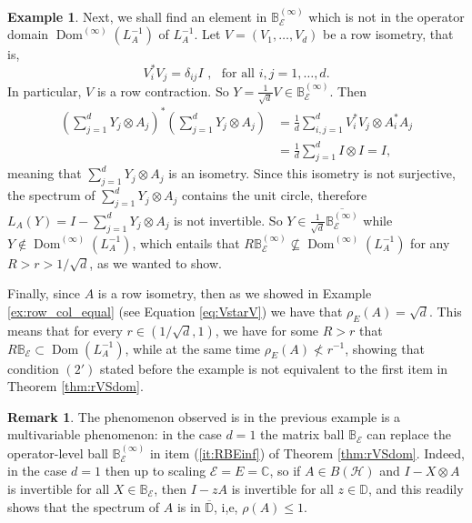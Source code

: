 \documentclass[12pt]{amsart}
\numberwithin{equation}{section}
\theoremstyle{definition}
\newtheorem{example}[theorem]{Example}
\newtheorem{remark}[theorem]{Remark}
\newcommand{\cE}{\mathcal{E}}
\newcommand{\cH}{\mathcal{H}}
\newcommand{\bB}{\mathbb{B}}
\newcommand{\bC}{\mathbb{C}}
\newcommand{\bD}{\mathbb{D}}
\newcommand{\ol}{\overline}
\newcommand{\dom}{\operatorname{Dom}}
\begin{document}
\begin{example}
    Next, we shall find an element in $\bB_\cE^{(\infty)}$ which is not in the operator domain $\dom^{(\infty)}(L_A^{-1})$ of $L_A^{-1}$. 
    Let $V = (V_1, \ldots, V_d)$ be a row isometry, that is, 
    \[
    V_i^* V_j = \delta_{ij}I \,\, , \,\, \textrm{ for all } i,j=1, \ldots, d. 
    \]
    In particular, $V$ is a row contraction. So $Y = \frac{1}{\sqrt{d}} V \in \bB_\cE^{(\infty)}$. 
    Then 
    \begin{align*}
    \left(\sum_{j=1}^d Y_j \otimes A_j\right)^* \left(\sum_{j=1}^d Y_j \otimes A_j\right) 
    &= \frac{1}{d}\sum_{i,j=1}^d V_i^* V_j \otimes A_i^* A_j \\
    &=\frac{1}{d} \sum_{j=1}^d I \otimes I = I, 
    \end{align*}
    meaning that $\sum_{j=1}^d Y_j \otimes A_j$ is an isometry. 
    Since this isometry is not surjective, the spectrum of $\sum_{j=1}^d Y_j \otimes A_j$ contains the unit circle, therefore $L_A(Y) = I - \sum_{j=1}^d Y_j \otimes A_j$ is not invertible. 
    So $Y \in \frac{1}{\sqrt{d}}\ol{\bB^{(\infty)}_\cE}$ while $Y \notin \dom^{(\infty)}(L_A^{-1})$, which entails that $R \bB^{(\infty)}_\cE \nsubseteq \dom^{(\infty)}(L_A^{-1})$ for any $R > r > 1/\sqrt{d}$, as we wanted to show. 

    Finally, since $A$ is a row isometry, then as we showed in Example \ref{ex:row_col_equal} (see Equation \eqref{eq:VstarV}) we have that $\rho_E(A) = \sqrt{d}$. 
    This means that for every $r \in (1/\sqrt{d},1)$, we have for some $R > r$ that $R\bB_\cE \subset \dom(L_A^{-1})$, while at the same time $\rho_E(A) \nless r^{-1}$, showing that condition $(2')$ stated before the example is not equivalent to the first item in Theorem \ref{thm:rVSdom}.
\end{example}

\begin{remark}
    The phenomenon observed is in the previous example is a multivariable phenomenon: in the case $d = 1$ the matrix ball $\bB_\cE$ can replace the operator-level ball $\bB^{(\infty)}_\cE$ in item (\ref{it:RBEinf}) of Theorem \ref{thm:rVSdom}. Indeed, in the case $d = 1$ then up to scaling $\cE = E = \bC$, so if $A \in B(\cH)$ and $I - X \otimes A$ is invertible for all $X \in \bB_\cE$, then $I - zA$ is invertible for all $z \in \bD$, and this readily shows that the spectrum of $A$ is in $\ol{\bD}$, i,e, $\rho(A) \leq 1$. 
\end{remark}
\end{document}
